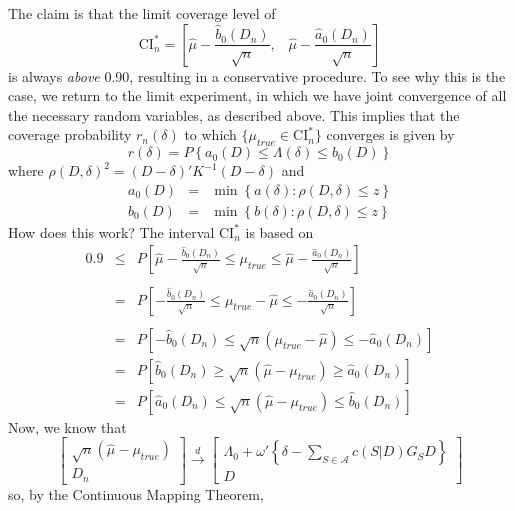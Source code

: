 \documentclass[12pt]{article}
\theoremstyle{definition}
\begin{document}
The claim is that the limit coverage level of
	$$\mbox{CI}_n^* = \left[\widehat{\mu} - \frac{\widehat{b}_0(D_n)}{\sqrt{n}} , \;\;\; \widehat{\mu} - \frac{\widehat{a}_0(D_n)}{\sqrt{n}}  \right]$$
is always \emph{above} 0.90, resulting in a conservative procedure. To see why this is the case, we return to the limit experiment, in which we have joint convergence of all the necessary random variables, as described above. This implies that the coverage probability $r_n(\delta)$ to which $\{\mu_{true}\in \mbox{CI}_n^*\}$ converges is given by
	$$r(\delta) = P\left\{ a_0(D) \leq \Lambda(\delta) \leq b_0(D)\right\}$$
where $\rho(D,\delta)^2 = \left(D - \delta\right)' K^{-1}\left(D- \delta \right)$ and
		\begin{eqnarray*}
		a_0(D)&=&\min \left\{a(\delta)\colon \rho(D, \delta) \leq z\right\}\\
		b_0(D)&=&\min \left\{b(\delta)\colon \rho(D, \delta) \leq z\right\}
\end{eqnarray*}
How does this work? The interval $\mbox{CI}_n^*$ is based on 
		\begin{eqnarray*}	
0.9&\leq&P\left[ \widehat{\mu} - \frac{\widehat{b}_0(D_n)}{\sqrt{n}} \leq \mu_{true}\leq \widehat{\mu} - \frac{\widehat{a}_0(D_n)}{\sqrt{n}}  \right]\\\\
		&=& P\left[  - \frac{\widehat{b}_0(D_n)}{\sqrt{n}} \leq \mu_{true} - \widehat{\mu}\leq  - \frac{\widehat{a}_0(D_n)}{\sqrt{n}}  \right]\\\\
		&=& P\left[  - \widehat{b}_0(D_n) \leq \sqrt{n}\left(\mu_{true} - \widehat{\mu}\right)\leq  - \widehat{a}_0(D_n) \right]\\
		&=& P\left[ \widehat{b}_0(D_n) \geq \sqrt{n}\left( \widehat{\mu}-\mu_{true}\right)\geq  \widehat{a}_0(D_n) \right]\\
		&=& P\left[ \widehat{a}_0(D_n) \leq \sqrt{n}\left( \widehat{\mu}-\mu_{true}\right)\leq  \widehat{b}_0(D_n) \right]
\end{eqnarray*}
Now, we know that
	$$
	\left[\begin{array}{c}
		\sqrt{n}(\hat{\mu} - \mu_{true})\\
		D_n
\end{array}\right] \overset{d}{\rightarrow}
		\left[\begin{array}{c}
		\Lambda_0 + \omega' \left\{ \delta - \sum_{S \in \mathcal{A}}  c(S|D)G_S D \right\}\\
		D
\end{array}\right] 	
$$
so, by the Continuous Mapping Theorem,
\end{document}
